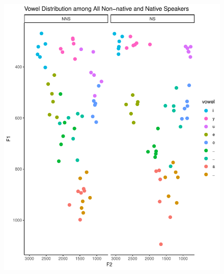\documentclass[man, fleqn, noextraspace]{apa6}
\begin{document}
\begin{figure}
\centering
\includegraphics{Vowel_v3_files/figure-latex/figure1-1.pdf}
\caption{}
\end{figure}
\end{document}
